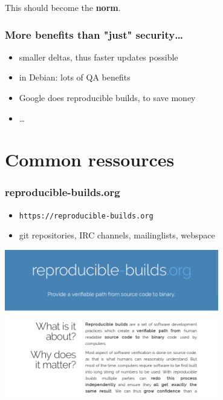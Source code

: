\documentclass[14pt,aspectratio=169]{beamer}
\begin{document}
\begin{frame}[plain]
\begin{center}
 \Huge{This should become the \textbf{norm}.}

\end{center}
\end{frame}

\begin{frame}[fragile]
 \frametitle{More benefits than "just" security…}
 \begin{itemize}
  \item smaller deltas, thus faster updates possible
  \item in Debian: lots of QA benefits
  \item Google does reproducible builds, to save money
  \item …
 \end{itemize}
\end{frame}



\section{Common ressources}

\begin{frame}
 \frametitle{reproducible-builds.org}

 \begin{itemize}
  \item \texttt{https://reproducible-builds.org}
  \item git repositories, IRC channels, mailinglists, webspace
 \end{itemize}
 \begin{center}
 \includegraphics[width=0.7\textwidth]{images/rbwww1.png}
 \end{center}
\end{frame}
\end{document}
